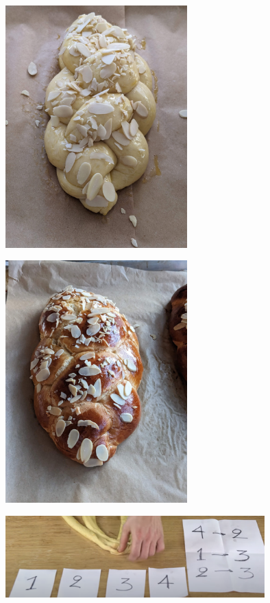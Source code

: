 \begin{figure}
  \includegraphics[width=70mm]{velsa/images/PXL_20240331_211621965.PORTRAIT.ORIGINAL.jpg}
\end{figure}
\begin{figure}
  \includegraphics[width=70mm]{velsa/images/PXL_20240331_230346663.PORTRAIT.ORIGINAL.jpg}
\end{figure}
\begin{figure}
  \includegraphics[width=100mm]{velsa/images/Tsoureki braid_Aki.PNG}
\end{figure}
